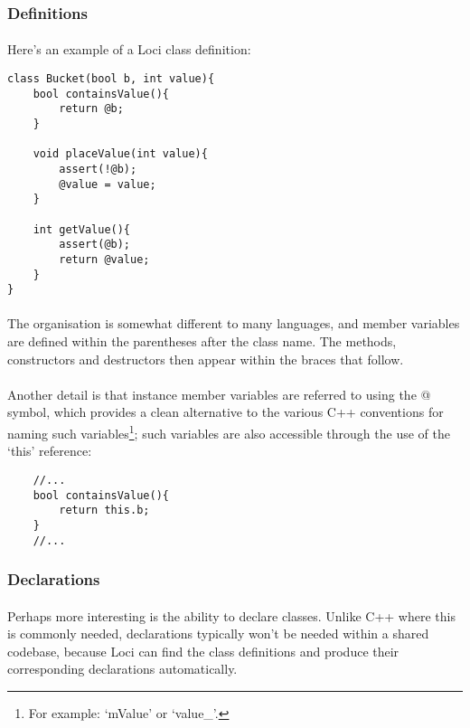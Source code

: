 \documentclass[12pt,twoside,notitlepage]{report}
\begin{document}
\subsubsection{Definitions}

\paragraph{}
Here's an example of a Loci class definition:

\small{
\begin{verbatim}
class Bucket(bool b, int value){
    bool containsValue(){
        return @b;
    }
    
    void placeValue(int value){
        assert(!@b);
        @value = value;
    }
    
    int getValue(){
        assert(@b);
        return @value;
    }
}
\end{verbatim}
}

\paragraph{}
The organisation is somewhat different to many languages, and member variables are defined within the parentheses after the class name. The methods, constructors and destructors then appear within the braces that follow.

\paragraph{}
Another detail is that instance member variables are referred to using the @ symbol, which provides a clean alternative to the various C++ conventions for naming such variables\footnote{For example: `mValue' or `value\_'.}; such variables are also accessible through the use of the `this' reference:

\small{
\begin{verbatim}
    //...
    bool containsValue(){
        return this.b;
    }
    //...
\end{verbatim}
}

\subsubsection{Declarations}

\paragraph{}
Perhaps more interesting is the ability to declare classes. Unlike C++ where this is commonly needed, declarations typically won't be needed within a shared codebase, because Loci can find the class definitions and produce their corresponding declarations automatically.
\end{document}
